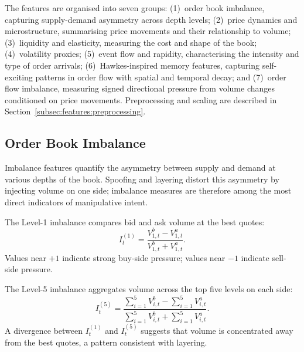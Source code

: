 \documentclass[11pt]{report}
\begin{document}
The features are organised into seven groups: (1)~order book imbalance, capturing supply-demand asymmetry across depth levels; (2)~price dynamics and microstructure, summarising price movements and their relationship to volume; (3)~liquidity and elasticity, measuring the cost and shape of the book; (4)~volatility proxies; (5)~event flow and rapidity, characterising the intensity and type of order arrivals; (6)~Hawkes-inspired memory features, capturing self-exciting patterns in order flow with spatial and temporal decay; and (7)~order flow imbalance, measuring signed directional pressure from volume changes conditioned on price movements. Preprocessing and scaling are described in Section~\ref{subsec:features:preprocessing}.


\subsection{Order Book Imbalance}\label{subsec:features:imbalance}

Imbalance features quantify the asymmetry between supply and demand at various depths of the book. Spoofing and layering distort this asymmetry by injecting volume on one side; imbalance measures are therefore among the most direct indicators of manipulative intent.

The Level-1 imbalance compares bid and ask volume at the best quotes:
\begin{equation}
  \label{eq:l1_imbalance}
  I^{(1)}_t = \frac{V^b_{1,t} - V^a_{1,t}}{V^b_{1,t} + V^a_{1,t}}.
\end{equation}
Values near $+1$ indicate strong buy-side pressure; values near $-1$ indicate sell-side pressure.

The Level-5 imbalance aggregates volume across the top five levels on each side:
\begin{equation}
  \label{eq:l5_imbalance}
  I^{(5)}_t = \frac{\sum_{i=1}^{5} V^b_{i,t} - \sum_{i=1}^{5} V^a_{i,t}}{\sum_{i=1}^{5} V^b_{i,t} + \sum_{i=1}^{5} V^a_{i,t}}.
\end{equation}
A divergence between $I^{(1)}_t$ and $I^{(5)}_t$ suggests that volume is concentrated away from the best quotes, a pattern consistent with layering.
\end{document}
